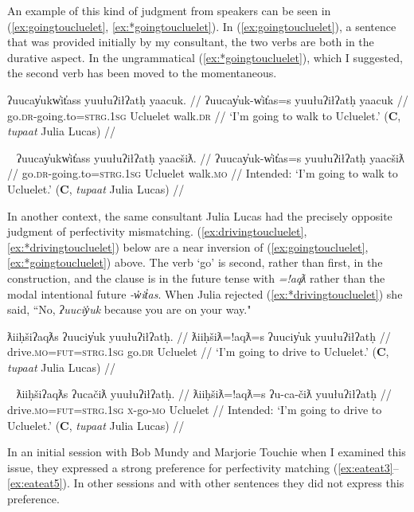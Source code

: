 An example of this kind of judgment from speakers can be seen in (\ref{ex:goingtoucluelet}, \ref{ex:*goingtoucluelet}). In (\ref{ex:goingtoucluelet}), a sentence that was provided initially by my consultant, the two verbs are both in the durative aspect. In the ungrammatical (\ref{ex:*goingtoucluelet}), which I suggested, the second verb has been moved to the momentaneous.

\ex \label{ex:goingtoucluelet}
\begingl
\glpreamble ʔuucay̓ukw̓it̓ass yuułuʔiłʔatḥ yaacuk. //
\gla ʔuucay̓uk-w̓it̓as=s yuułuʔiłʔatḥ yaacuk //
\glb go.\textsc{dr}-going.to=\textsc{strg.1sg} Ucluelet walk.\textsc{dr} //
\glft `I'm going to walk to Ucluelet.' (\textbf{C}, \textit{tupaat} Julia Lucas) //
\endgl
\xe

\ex~ \label{ex:*goingtoucluelet}
\begingl
\glpreamble *ʔuucay̓ukw̓it̓ass yuułuʔiłʔatḥ yaacšiƛ. //
\gla ʔuucay̓uk-w̓it̓as=s yuułuʔiłʔatḥ yaacšiƛ //
\glb go.\textsc{dr}-going.to=\textsc{strg.1sg} Ucluelet walk.\textsc{mo} //
\glft Intended: `I'm going to walk to Ucluelet.' (\textbf{C}, \textit{tupaat} Julia Lucas) //
\endgl
\xe

In another context, the same consultant Julia Lucas had the precisely opposite judgment of perfectivity mismatching. (\ref{ex:drivingtoucluelet}, \ref{ex:*drivingtoucluelet}) below are a near inversion of (\ref{ex:goingtoucluelet}, \ref{ex:*goingtoucluelet}) above. The verb `go' is second, rather than first, in the construction, and the clause is in the future tense with \textit{=!aqƛ} rather than the modal intentional future \textit{-w̓it̓as}.  When Julia rejected (\ref{ex:*drivingtoucluelet}) she said, ``No, \textit{ʔuuciy̓uk} because you are on your way."

\ex \label{ex:drivingtoucluelet}
\begingl
\glpreamble ƛiiḥšiʔaqƛs ʔuuciy̓uk yuułuʔiłʔatḥ. //
\gla ƛiiḥšiƛ=!aqƛ=s ʔuuciy̓uk yuułuʔiłʔatḥ //
\glb drive.\textsc{mo}=\textsc{fut}=\textsc{strg.1sg} go.\textsc{dr} Ucluelet //
\glft `I'm going to drive to Ucluelet.' (\textbf{C}, \textit{tupaat} Julia Lucas) //
\endgl
\xe

\ex~ \label{ex:*drivingtoucluelet}
\begingl
\glpreamble *ƛiiḥšiʔaqƛs ʔucačiƛ yuułuʔiłʔatḥ. //
\gla ƛiiḥšiƛ=!aqƛ=s ʔu-ca-čiƛ yuułuʔiłʔatḥ //
\glb drive.\textsc{mo}=\textsc{fut}=\textsc{strg.1sg} \textsc{x}-go-\textsc{mo} Ucluelet //
\glft Intended: `I'm going to drive to Ucluelet.' (\textbf{C}, \textit{tupaat} Julia Lucas) //
\endgl
\xe

In an initial session with Bob Mundy and Marjorie Touchie when I examined this issue, they expressed a strong preference for perfectivity matching (\ref{ex:eateat3}--\ref{ex:eateat5}). In other sessions and with other sentences they did not express this preference.

